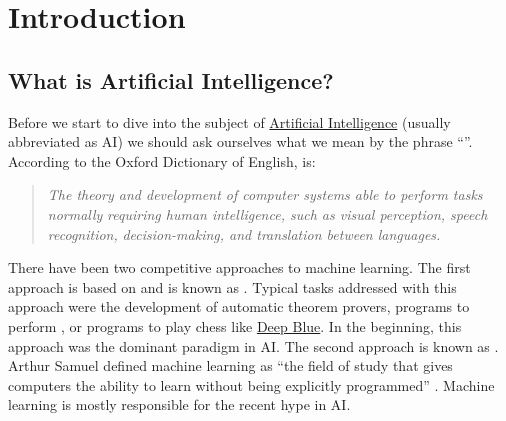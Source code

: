 \chapter{Introduction}

\section{What is Artificial Intelligence?}
Before we start to dive into the subject of
\href{https://en.wikipedia.org/wiki/Artificial_intelligence}{Artificial Intelligence} (usually abbreviated as
AI) we should ask ourselves what we mean by the phrase ``''.
According to the Oxford Dictionary of English, 
 is:
\begin{quote}
  \colorbox{sepia}{\textsl{The theory and development of computer systems able to perform tasks normally}} \linebreak
  \colorbox{sepia}{\textsl{requiring human intelligence, such as visual perception, speech recognition,}}  \linebreak
  \colorbox{sepia}{\textsl{decision-making, and translation between languages.}} 
\end{quote}
There have been two competitive approaches to machine learning.  The first approach is based on
 and is known as .  
Typical tasks addressed with this approach were the development of automatic theorem provers, programs to
perform , or programs to play chess like
\href{https://en.wikipedia.org/wiki/Deep_Blue_(chess_computer)}{Deep Blue}.
In the beginning, this approach was the dominant paradigm in AI.
The second approach is known as .  Arthur Samuel defined machine learning as
``the field of study that gives computers the ability to learn without being
explicitly programmed'' \cite{samuel:1959}. 
Machine learning is mostly responsible for the recent hype in AI.

